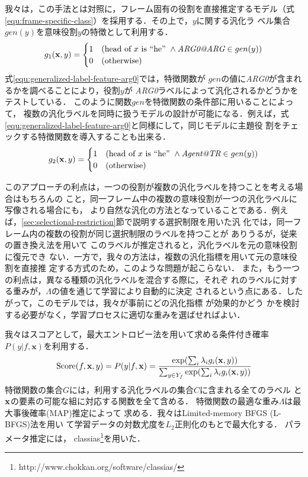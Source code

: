 \documentclass[japanese]{jnlp_1.4}
\begin{document}
我々は，この手法とは対照に，フレーム固有の役割を直接推定するモデル（式
\ref{equ:frame-specific-class}）を採用する．その上で，$y$に関する汎化ラ
ベル集合$gen(y)$を意味役割$y$の特徴として利用する．
\begin{equation}
 g_1(\mathbf{x},y) = 
  \begin{cases}
   1 & (\mbox{head of }x\mbox{ is ``he''}~\wedge 
      \mbox{{\it ARG0@ARG}} \in gen(y))\\
   0 & (\mbox{otherwise})
  \end{cases}
\label{equ:generalized-label-feature-arg0}
\end{equation} 
式\ref{equ:generalized-label-feature-arg0}では，特徴関数が
$gen$の値に{\it ARG0}が含まれるかを調べることにより，役割$y$が
{\it ARG0}ラベルによって汎化されるかどうかをテストしている．
このように関数$gen$を特徴関数の条件部に用いることによって，
複数の汎化ラベルを同時に扱うモデルの設計が可能になる．例えば，式
\ref{equ:generalized-label-feature-arg0}と同様にして，同じモデルに主題役
割をチェックする特徴関数を導入することも出来る．
\begin{equation}
 g_2(\mathbf{x},y) = 
  \begin{cases}
   1 & (\mbox{head of }x\mbox{ is ``he''}~\wedge 
      \mbox{{\it Agent@TR}} \in gen(y))\\
   0 & (\mbox{otherwise})
  \end{cases}
\label{equ:generalized-label-feature-agent}
\end{equation}

このアプローチの利点は，一つの役割が複数の汎化ラベルを持つことを考える場
合はもちろんの
こと，同一フレーム中の複数の意味役割が一つの汎化ラベルに写像される場合にも，
より自然な汎化の方法となっていることである．例え
ば，\ref{sec:selectional-restriction}節で説明する選択制限を用いた汎
化では，同一フレーム内の複数の役割が同じ選択制限のラベルを持つことが
ありうるが，従来の置き換え法を用いて
このラベルが推定されると，汎化ラベルを元の意味役割に復元でき
ない．一方で，我々の方法は，複数の汎化指標を用いて元の意味役割を直接推
定する方式のため，このような問題が起こらない．
また，もう一つの利点は，異なる種類の汎化ラベルを混合する際に，それぞ
れのラベルに対する重みが，$\Lambda$の値を通じて学習により自動的に決定
されるという点にある．したがって，このモデルでは，我々が事前にどの汎化指標
が効果的かどう
かを検討する必要がなく，学習プロセスに適切な重みを選ばせればよい．

我々はスコアとして，最大エントロピー法を用いて求める条件付き確率
$P(y|f,\mathbf{x})$を利用する．
\begin{equation}
{\rm Score}(f,\mathbf{x},y) = P(y|f,\mathbf{x}) =
  \frac{\exp(\sum_{i}\lambda_{i}g_i(\mathbf{x},y))}{\sum_{y\in
  Y_f}\exp(\sum_{i}\lambda_{i}g_i(\mathbf{x},y))}
\label{eqn:probability}
\end{equation}
特徴関数の集合$G$には，利用する汎化ラベルの集合$C$に含まれる全てのラベル
と${\bf x}$の要素の可能な組に対応する関数を全て含める．
特徴関数の最適な重み$\Lambda$は最大事後確率(MAP)推定によって
求める．我々はLimited-memory BFGS (L-BFGS)法\cite{nocedal1980}を用い
て学習データの対数尤度を$L_2$正則化のもとで最大化する．
パラメータ推定には，
classias\footnote{http://www.chokkan.org/software/classias/}を用いた．
\end{document}
